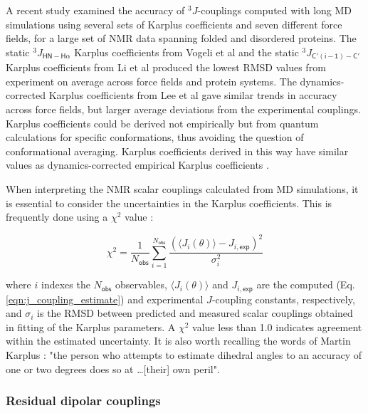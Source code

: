 \documentclass[9pt,review]{livecoms}
\begin{document}
A recent study \cite{robustelli_developing_2018} examined the accuracy of $^3J$-couplings computed with long MD simulations using several sets of Karplus coefficients and seven different force fields, for a large set of NMR data spanning folded and disordered proteins. The static $^3J_{\mathsf{HN-H\alpha}}$ Karplus coefficients from Vogeli et al \cite{vogeli_limits_2007} and the static $^3J_{\mathsf{C'(i-1)-C'}}$ Karplus coefficients from Li et al \cite{li_high_2015} produced the lowest RMSD values from experiment on average across force fields and protein systems.
The dynamics-corrected Karplus coefficients from Lee et al \cite{lee_quantitative_2015} gave similar trends in accuracy across force fields, but larger average deviations from the experimental couplings.
Karplus coefficients could be derived not empirically but from quantum calculations for specific conformations, thus avoiding the question of conformational averaging.
Karplus coefficients derived in this way have similar values as dynamics-corrected empirical Karplus coefficients \cite{brueschweiler_adding_1994,case_static_2000,chou_insights_2003,lindorff-larsen_interpreting_2005,vogeli_limits_2007,lee_quantitative_2015}.

When interpreting the NMR scalar couplings calculated from MD simulations, it is essential to consider the uncertainties in the Karplus coefficients.
This is frequently done using a $\chi^2$ value \cite{best_balanced_2014,robustelli_developing_2018}:

\begin{equation}
\label{eqn:chi_sq}
\chi^2 = \frac {1} {N_{\mathsf{obs}}} \sum_{i=1}^{N_{\mathsf{obs}}} \frac {\left( \langle J_i(\theta) \rangle - J_{i,\mathsf{exp}} \right)^2} {\sigma_i^2}
\end{equation}

\noindent where $i$ indexes the $N_{\mathsf{obs}}$ observables, $\langle J_i(\theta) \rangle$ and $J_{i,\mathsf{exp}}$ are the computed (Eq. \ref{eqn:j_coupling_estimate}) and experimental $J$-coupling constants, respectively, and $\sigma_i$ is the RMSD between predicted and measured scalar couplings obtained in fitting of the Karplus parameters. A $\chi^2$ value less than 1.0 indicates agreement within the estimated uncertainty. It is also worth recalling the words of Martin Karplus \cite{karplus_vicinal_1963}: "the person who attempts to estimate dihedral angles to an accuracy of one or two degrees does so at \ldots [their] own peril".

\subsubsection{Residual dipolar couplings}
\label{sub2:rdc}
\end{document}
